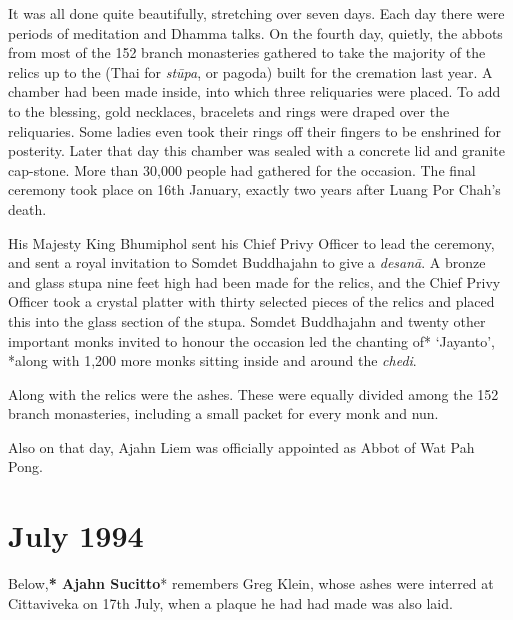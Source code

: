 It was all done quite beautifully, stretching over seven days. Each day
there were periods of meditation and Dhamma talks. On the fourth day,
quietly, the abbots from most of the 152 branch monasteries gathered to
take the majority of the relics up to the (Thai for \emph{stūpa}, or
pagoda) built for the cremation last year. A chamber had been made
inside, into which three reliquaries were placed. To add to the
blessing, gold necklaces, bracelets and rings were draped over the
reliquaries. Some ladies even took their rings off their fingers to be
enshrined for posterity. Later that day this chamber was sealed with a
concrete lid and granite cap-stone. More than 30,000 people had gathered
for the occasion. The final ceremony took place on 16th January, exactly
two years after Luang Por Chah's death.

His Majesty King Bhumiphol sent his Chief Privy Officer to lead the
ceremony, and sent a royal invitation to Somdet Buddhajahn to give a
\emph{desanā}. A bronze and glass stupa nine feet high had been made for
the relics, and the Chief Privy Officer took a crystal platter with
thirty selected pieces of the relics and placed this into the glass
section of the stupa. Somdet Buddhajahn and twenty other important monks
invited to honour the occasion led the chanting of* `Jayanto', *along
with 1,200 more monks sitting inside and around the \emph{chedi}.

Along with the relics were the ashes. These were equally divided among
the 152 branch monasteries, including a small packet for every monk and
nun.

Also on that day, Ajahn Liem was officially appointed as Abbot of Wat
Pah Pong.

\chapter{July 1994}

Below,\textbf{* Ajahn Sucitto}* remembers Greg Klein, whose ashes were
interred at Cittaviveka on 17th July, when a plaque he had had made was
also laid.

